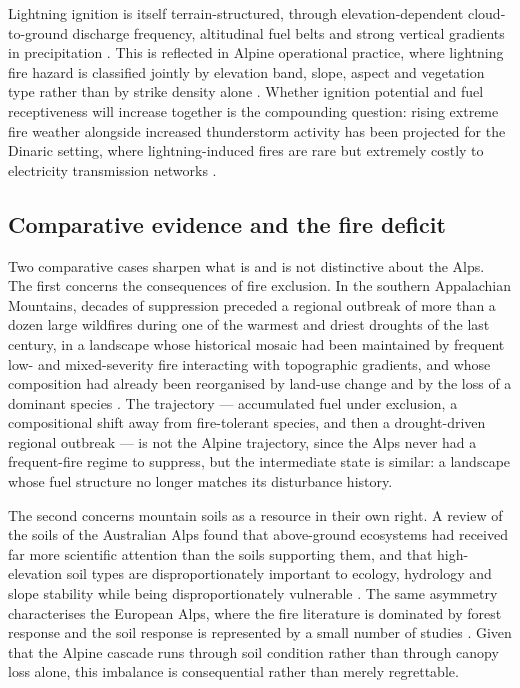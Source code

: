 \documentclass[11pt,a4paper]{article}
\begin{document}
Lightning ignition is itself terrain-structured, through elevation-dependent cloud-to-ground discharge frequency, altitudinal fuel belts and strong vertical gradients in precipitation \citep{baranovskiy_deterministic_2021}. This is reflected in Alpine operational practice, where lightning fire hazard is classified jointly by elevation band, slope, aspect and vegetation type rather than by strike density alone \citep{muller_towards_2020}. Whether ignition potential and fuel receptiveness will increase together is the compounding question: rising extreme fire weather alongside increased thunderstorm activity has been projected for the Dinaric setting, where lightning-induced fires are rare but extremely costly to electricity transmission networks \citep{kyriakopoulos_impact_2023}.


\subsection{Comparative evidence and the fire deficit}

Two comparative cases sharpen what is and is not distinctive about the Alps. The first concerns the consequences of fire exclusion. In the southern Appalachian Mountains, decades of suppression preceded a regional outbreak of more than a dozen large wildfires during one of the warmest and driest droughts of the last century, in a landscape whose historical mosaic had been maintained by frequent low- and mixed-severity fire interacting with topographic gradients, and whose composition had already been reorganised by land-use change and by the loss of a dominant species \citep{reilly_drivers_2022}. The trajectory --- accumulated fuel under exclusion, a compositional shift away from fire-tolerant species, and then a drought-driven regional outbreak --- is not the Alpine trajectory, since the Alps never had a frequent-fire regime to suppress, but the intermediate state is similar: a landscape whose fuel structure no longer matches its disturbance history.

The second concerns mountain soils as a resource in their own right. A review of the soils of the Australian Alps found that above-ground ecosystems had received far more scientific attention than the soils supporting them, and that high-elevation soil types are disproportionately important to ecology, hydrology and slope stability while being disproportionately vulnerable \citep{wilson_distribution_2022}. The same asymmetry characterises the European Alps, where the fire literature is dominated by forest response and the soil response is represented by a small number of studies \citep{negri_wildfire_2026}. Given that the Alpine cascade runs through soil condition rather than through canopy loss alone, this imbalance is consequential rather than merely regrettable.
\end{document}

